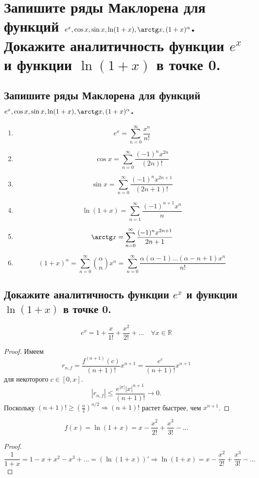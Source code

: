 \section{Запишите ряды Маклорена для функций $e^x, \cos x, \sin x, \ln(1+x), \arctg x, (1 + x)^\alpha$. Докажите аналитичность функции $e^x$ и функции $\ln (1+x)$ в точке 0.}

\subsection{Запишите ряды Маклорена для функций $e^x, \cos x, \sin x, \ln(1+x), \arctg x, (1 + x)^\alpha$.}
\begin{enumerate}
    \item $$e^x = \sum_{n=0}^\infty \frac{x^n}{n!}$$
    \item $$\cos x = \sum_{n=0}^\infty \frac{(-1)^n x^{2n}}{(2n)!}$$
    \item $$\sin x = \sum_{n=0}^\infty \frac{(-1)^n x^{2n + 1}}{(2n + 1)!}$$
    \item $$\ln (1 + x) = \sum_{n=1}^\infty \frac{(-1)^{n+1} x^n}{n}$$
    \item $$\arctg x = \sum_{n=0}^\infty \frac{(-1)^n x^{2n + 1}}{2n + 1}$$
    \item $$(1 + x)^\alpha = \sum_{n=0}^\infty \binom{\alpha}{n} x^n = \sum_{n=0}^\infty  \frac{\alpha(\alpha - 1)...(\alpha - n + 1)x^n}{n!}$$
\end{enumerate}

\subsection{Докажите аналитичность функции $e^x$ и функции $\ln (1+x)$ в точке 0.}
\begin{statement}
    \[
        e^x = 1 + \frac{x}{1!} + \frac{x^2}{2!} + ...
        \quad \forall x \in \mathbb{R}
    \]
    \begin{proof}
        Имеем 
        \[
            r_{n, f} = \frac{f^{(n+1)}(c)}{(n+1)!} x^{n+1} = \frac{e^c}{(n+1)!} x^{n+1}
        \]  для некоторого $c \in [0, x]$.
        \[
            |r_{n, f}| \leqslant \frac{e^{|x|} |x|^{n+1}}{(n+1)!} \to 0.
        \]
        Поскольку $(n+1)! \geqslant (\frac{n}{2})^{n/2} \Rightarrow (n+1)!$ растет быстрее, чем $x^{n+1}$.
    \end{proof}
\end{statement}
\begin{statement}
    \[
        f(x) = \ln (1 + x) = x - \frac{x^2}{2!} + \frac{x^3}{3!} -...
    \]
    \begin{proof}
        \[
            \frac{1}{1+ x} = 1 - x + x^2 - x^3 + ... = (\ln(1 + x))'
            \Rightarrow
            \ln (1 + x) = x - \frac{x^2}{2!} + \frac{x^3}{3!} -...
        \]
    \end{proof}
\end{statement}
